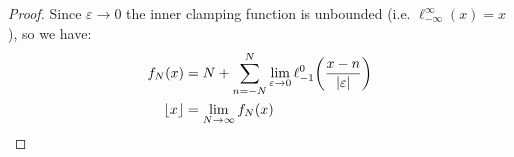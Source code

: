 \begin{example}
\begin{proof}
        Since $\varepsilon\to 0$ the inner clamping function is unbounded (i.e. $\ell_{-\infty}^{\infty}(x)=x$), so we have:
        \begin{align*}
            f_N(x) &= N+\sum_{n=-N}^{N}{\lim_{\varepsilon\to0}{\ell_{-1}^{0}\paren*{\frac{x-n}{\abs{\varepsilon}}}}}\\
            \floor{x} &= \lim_{N\to\infty}{f_N(x)}
        \end{align*}
    \end{proof}
\end{example}

\newpage